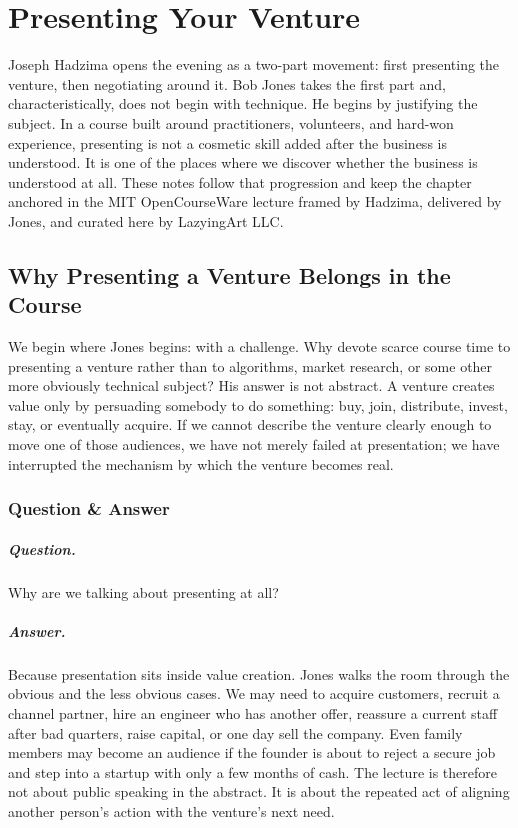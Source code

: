 \chapter{Presenting Your Venture}

Joseph Hadzima opens the evening as a two-part movement: first presenting the venture, then negotiating around it. Bob Jones takes the first part and, characteristically, does not begin with technique. He begins by justifying the subject. In a course built around practitioners, volunteers, and hard-won experience, presenting is not a cosmetic skill added after the business is understood. It is one of the places where we discover whether the business is understood at all. These notes follow that progression and keep the chapter anchored in the MIT OpenCourseWare lecture framed by Hadzima, delivered by Jones, and curated here by LazyingArt LLC.

\section{Why Presenting a Venture Belongs in the Course}

We begin where Jones begins: with a challenge. Why devote scarce course time to presenting a venture rather than to algorithms, market research, or some other more obviously technical subject? His answer is not abstract. A venture creates value only by persuading somebody to do something: buy, join, distribute, invest, stay, or eventually acquire. If we cannot describe the venture clearly enough to move one of those audiences, we have not merely failed at presentation; we have interrupted the mechanism by which the venture becomes real.

\subsection{Question \& Answer}

\paragraph{Question.} Why are we talking about presenting at all?

\paragraph{Answer.} Because presentation sits inside value creation. Jones walks the room through the obvious and the less obvious cases. We may need to acquire customers, recruit a channel partner, hire an engineer who has another offer, reassure a current staff after bad quarters, raise capital, or one day sell the company. Even family members may become an audience if the founder is about to reject a secure job and step into a startup with only a few months of cash. The lecture is therefore not about public speaking in the abstract. It is about the repeated act of aligning another person's action with the venture's next need.

